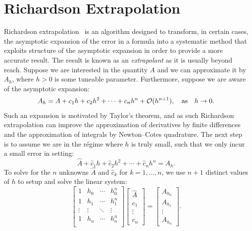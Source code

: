 
\section{Richardson Extrapolation}

Richardson extrapolation~\cite{Richardson-210-459-11} is an algorithm designed to transform, in certain cases, the asymptotic expansion of the error in a formula into a systematic method that exploits structure of the asymptotic expansion in order to provide a more accurate result. The result is known as an {\em extrapolant} as it is usually beyond reach. Suppose we are interested in the quantity $A$ and we can approximate it by $A_h$, where $h>0$ is some tuneable parameter. Furthermore, suppose we are aware of the asymptotic expansion:
\[
A_h = A + c_1h + c_2h^2 + \cdots + c_nh^n + \mathcal{O}(h^{n+1}),\quad{\rm as}\quad h\to0.
\]
Such an expansion is motivated by Taylor's theorem, and as such Richardson extrapolation can improve the approximation of derivatives by finite differences and the approximation of integrals by Newton--Cotes quadrature. The next step is to assume we are in the r\'egime where $h$ is truly small, such that we only incur a small error in setting:
\begin{equation}\label{eq:RichardsonExtrapolation}
\hat{A} + \hat{c}_1h + \hat{c}_2h^2 + \cdots + \hat{c}_nh^n = A_h.
\end{equation}
To solve for the $n$ unknowns $\hat{A}$ and $\hat{c}_k$ for $k=1,\ldots,n$, we use $n+1$ distinct values of $h$ to setup and solve the linear system:
\begin{equation}\label{eq:Vandermonde}
\begin{bmatrix}
1 & h_0 & \cdots & h_0^n\\
1 & h_1 & \cdots & h_1^n\\
\vdots & \vdots & \ddots & \vdots\\
1 & h_n & \cdots & h_n^n\\
\end{bmatrix}
\begin{bmatrix} \hat{A}\\\hat{c}_1\\\vdots\\\hat{c}_n\end{bmatrix}
=
\begin{bmatrix} A_{h_0}\\A_{h_1}\\\vdots\\A_{h_n}\end{bmatrix}.
\end{equation}

